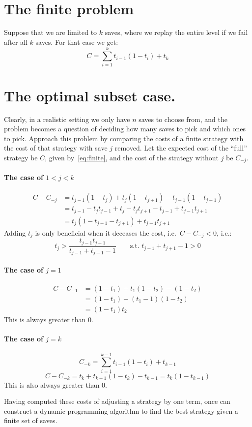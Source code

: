 \documentclass{article}
\begin{document}
\section{The finite problem}
Suppose that we are limited to $k$ saves, where we replay the entire level if we fail after all $k$ saves.
For that case we get:
\begin{equation}\label{eq:finite}
C = \sum_{i=1}^k t_{i-1} (1 - {t_i}) + t_k
\end{equation}

\section{The optimal subset case.}

Clearly, in a realistic setting we only have $n$ saves to choose from, and the problem becomes a question of deciding how many saves to pick and which ones to pick.
Approach this problem by comparing the costs of a finite strategy with the cost of that strategy with save $j$ removed.
Let the expected cost of the ``full'' strategy be $C$, given by~\eqref{eq:finite}, and the cost of the strategy without $j$ be $C_{-j}$.

\paragraph{The case of $1<j<k$}
\begin{align*}
 C - C_{-j} &= t_{j-1} (1-t_j) + t_j(1-t_{j+1}) - t_{j-1} ( 1-t_{j+1} ) \\
 &= t_{j-1} - t_j t_{j-1} + t_j -t_j t_{j+1} - t_{j-1} + t_{j-1} t_{j+1} \\
 &= t_j (1-t_{j-1}-t_{j+1} ) + t_{j-1} t_{j+1}
\end{align*}
Adding $t_j$ is only beneficial when it deceases the cost, i.e.\ $C- C_{-j} < 0$, i.e.:
\[
 t_j > \frac{t_{j-1} t_{j+1}}{ t_{j-1} + t_{j+1} - 1 } \qquad \text{s.t. } t_{j-1} + t_{j+1} - 1 > 0 
\]
\paragraph{The case of $j=1$}
\begin{align*}
 C - C_{-1} &=  (1-t_1)+t_1(1-t_2) - (1-t_2) \\
 &= (1-t_1) + (t_1 - 1) ( 1 - t_2) \\
 &= (1-t_1) t_2
\end{align*}
This is always greater than 0.
\paragraph{The case of $j=k$}
\[
 C_{-k} = \sum_{i=1}^{k-1} t_{i-1} (1 - {t_i}) + t_{k-1}
\]
\[
C - C_{-k} = t_k + t_{k-1}(1-t_{k}) -t_{k-1} = t_k (1-t_{k-1})
\]
This is also always greater than 0.

Having computed these costs of adjusting a strategy by one term, once can construct a dynamic programming algorithm to find the best strategy given a finite set of saves.
\end{document}
